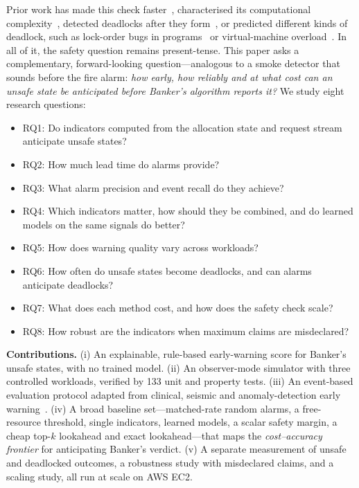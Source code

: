 \documentclass[conference]{IEEEtran}
\begin{document}
Prior work has made this check faster~\cite{Belik1987,Finkel1987,Zohora2024}, characterised its computational complexity~\cite{Gold1978,Minoura1982}, detected deadlocks after they form~\cite{Agrawal1983,Chandy1983}, or predicted different kinds of deadlock, such as lock-order bugs in programs~\cite{Tunc2023} or virtual-machine overload~\cite{LeNgoc2023}. In all of it, the safety question remains present-tense. This paper asks a complementary, forward-looking question---analogous to a smoke detector that sounds before the fire alarm: \emph{how early, how reliably and at what cost can an unsafe state be anticipated before Banker's algorithm reports it?} We study eight research questions:
\begin{itemize}
\item RQ1: Do indicators computed from the allocation state and request stream anticipate unsafe states?
\item RQ2: How much lead time do alarms provide?
\item RQ3: What alarm precision and event recall do they achieve?
\item RQ4: Which indicators matter, how should they be combined, and do learned models on the same signals do better?
\item RQ5: How does warning quality vary across workloads?
\item RQ6: How often do unsafe states become deadlocks, and can alarms anticipate deadlocks?
\item RQ7: What does each method cost, and how does the safety check scale?
\item RQ8: How robust are the indicators when maximum claims are misdeclared?
\end{itemize}

\textbf{Contributions.} (i) An explainable, rule-based early-warning score for Banker's unsafe states, with no trained model. (ii) An observer-mode simulator with three controlled workloads, verified by 133 unit and property tests. (iii) An event-based evaluation protocol adapted from clinical, seismic and anomaly-detection early warning~\cite{Hyland2020,Munchmeyer2021,Tatbul2018,Lavin2015}. (iv) A broad baseline set---matched-rate random alarms, a free-resource threshold, single indicators, learned models, a scalar safety margin, a cheap top-$k$ lookahead and exact lookahead---that maps the \emph{cost--accuracy frontier} for anticipating Banker's verdict. (v) A separate measurement of unsafe and deadlocked outcomes, a robustness study with misdeclared claims, and a scaling study, all run at scale on AWS EC2.
\end{document}
